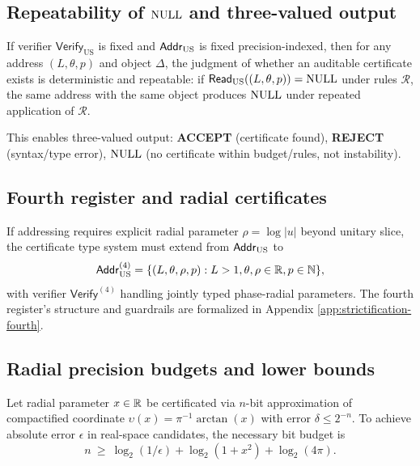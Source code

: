 \subsection{Repeatability of $\mathrm{NULL}$ and three-valued output}
\begin{theorem}\label{thm:cc-null-repro}
If verifier $\mathsf{Verify}_{\mathrm{US}}$ is fixed and $\mathsf{Addr}_{\mathrm{US}}$ is fixed precision-indexed, then for any address $(L,\theta,p)$ and object $\Delta$, the judgment of whether an auditable certificate exists is deterministic and repeatable: if $\mathsf{Read}_{\mathrm{US}}((L,\theta,p))=\mathrm{NULL}$ under rules $\mathcal{R}$, the same address with the same object produces $\mathrm{NULL}$ under repeated application of $\mathcal{R}$.
\end{theorem}

This enables three-valued output: \textbf{ACCEPT} (certificate found), \textbf{REJECT} (syntax/type error), \textbf{$\mathrm{NULL}$} (no certificate within budget/rules, not instability).

\subsection{Fourth register and radial certificates}
\begin{theorem}\label{thm:cc-fourth-register-certs}
If addressing requires explicit radial parameter $\rho=\log|u|$ beyond unitary slice, the certificate type system must extend from $\mathsf{Addr}_{\mathrm{US}}$ to
$$
\mathsf{Addr}_{\mathrm{US}}^{(4)}=\{(L,\theta,\rho,p):L>1,\theta,\rho\in\mathbb{R},p\in\mathbb{N}\},
$$
with verifier $\mathsf{Verify}^{(4)}$ handling jointly typed phase-radial parameters. The fourth register's structure and guardrails are formalized in Appendix \ref{app:strictification-fourth}.
\end{theorem}

\subsection{Radial precision budgets and lower bounds}
\begin{theorem}\label{thm:cc-radial-bit-lowerbound}
Let radial parameter $x\in\mathbb{R}$ be certificated via $n$-bit approximation of compactified coordinate $\upsilon(x)=\pi^{-1}\arctan(x)$ with error $\delta\le 2^{-n}$. To achieve absolute error $\epsilon$ in real-space candidates, the necessary bit budget is
$$
n\ \ge\ \log_2(1/\epsilon) + \log_2(1+x^2) + \log_2(4\pi).
$$
\end{theorem}

